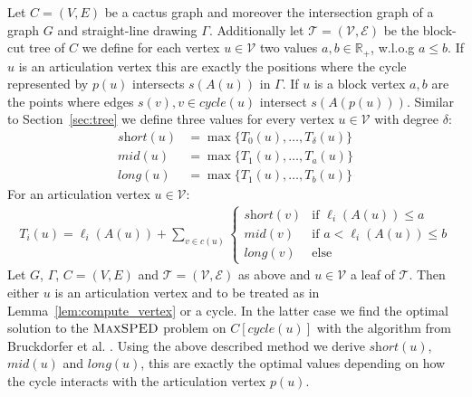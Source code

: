 \documentclass[a4paper,english,numberwithinsect]{eurocg18}
\newcommand{\maxsped}{\ensuremath{\textsc{MaxSPED}}\xspace}
\newcommand{\sollong}{\ensuremath{\textit{long}}\xspace}
\newcommand{\solmid}{\ensuremath{\textit{mid}}\xspace}
\newcommand{\solshort}{\ensuremath{\textit{short}}\xspace}
\begin{document}
Let $ C = (V,E) $ be a cactus graph and moreover the intersection graph of a graph $ G $ and straight-line drawing $ \Gamma $. Additionally let $ \mathcal T = (\mathcal V, \mathcal E) $ be the block-cut tree of $ C $ we define for each vertex $ u \in \mathcal V $ two values $ a,b \in \mathbb{R}_+ $, w.l.o.g $ a \leq b $. If $ u $ is an articulation vertex this are exactly the positions where the cycle represented by $ p(u) $ intersects $ s(A(u)) $ in $ \Gamma $. If $ u $ is a block vertex $ a,b $ are the points where edges $ s(v), v \in \textit{cycle}(u) $ intersect $ s(A(p(u))) $. Similar to Section~\ref{sec:tree} we define three values for every vertex $ u \in \mathcal V $ with degree $ \delta $:
\begin{align*}
	\solshort(u) &= \max\{T_0(u),\dots,T_\delta(u)\}\\
	\solmid(u) &= \max\{T_1(u),\dots,T_{a}(u)\}\\
	\sollong(u) &= \max\{T_1(u),\dots,T_{b}(u)\}
\end{align*}
For an articulation vertex $ u \in \mathcal V $:
\begin{align}
\label{rec:cactus_articulation}
T_i(u) = \ell_i(A(u)) + \sum_{v \in c(u)}
\begin{cases}
\solshort(v) & \text{if } \ell_i(A(u)) \leq a \\
\solmid(v) & \text{if } a < \ell_i(A(u)) \leq b \\
\sollong(v) & \text{else}
\end{cases}
\end{align}
	Let $ G $, $ \Gamma $,  $ C = (V,E) $ and $ \mathcal T = (\mathcal V,\mathcal E) $ as above and $ u \in \mathcal V $ a leaf of $ \mathcal T$. Then either $ u $ is an articulation vertex and to be treated as in Lemma~\ref{lem:compute_vertex} or a cycle. In the latter case we find the optimal solution to the \maxsped problem on $ C[\textit{cycle}(u)] $ with the algorithm from Bruckdorfer et al. \cite{bcgkmn-pped-17}. Using the above described method we derive $ \solshort(u) $, $ \solmid(u) $ and $ \sollong(u) $, this are exactly the optimal values depending on how the cycle interacts with the articulation vertex $ p(u) $.
\end{document}
